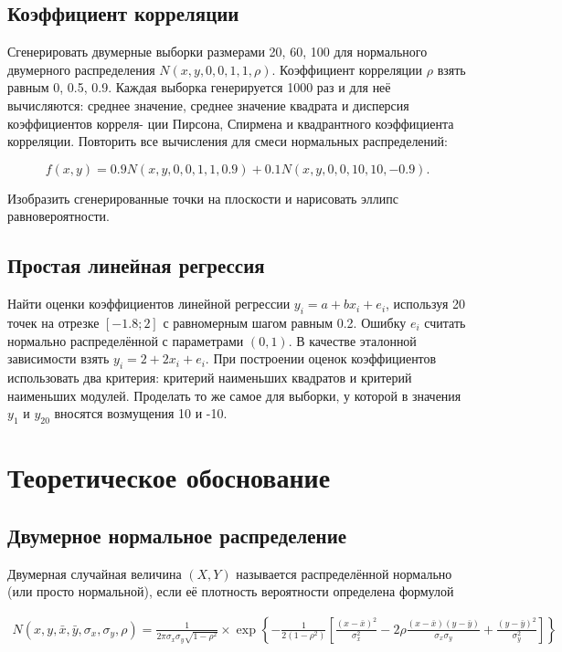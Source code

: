 \documentclass[12pt,a4paper]{article}
\begin{document}
	\subsection{Коэффициент корреляции}

	Сгенерировать двумерные выборки размерами 20, 60, 100 для нормального
	двумерного распределения \(N(x, y, 0, 0, 1, 1, \rho) \). Коэффициент
	корреляции \( \rho \) взять равным 0, 0.5, 0.9. Каждая выборка
	генерируется 1000 раз и для неё вычисляются: среднее значение, среднее
	значение квадрата и дисперсия коэффициентов корреля- ции Пирсона,
	Спирмена и квадрантного коэффициента корреляции. Повторить все
	вычисления для смеси нормальных распределений:

	\[
		f(x, y) = 0.9N(x, y, 0, 0, 1, 1, 0.9) + 0.1N(x, y, 0, 0, 10, 10, -0.9).
	\]

	Изобразить сгенерированные точки на плоскости и нарисовать эллипс
	равновероятности.

	\subsection{Простая линейная регрессия}

	Найти оценки коэффициентов линейной регрессии \( y_i = a + bx_i + e_i \),
	используя 20 точек на отрезке \( [-1.8; 2] \) с равномерным шагом равным
	0.2. Ошибку \( e_i \) считать нормально распределённой с параметрами
	\( (0, 1) \). В качестве эталонной зависимости взять
	\( y_i = 2 + 2x_i + e_i \). При построении оценок коэффициентов
	использовать два критерия: критерий наименьших квадратов и критерий
	наименьших модулей. Проделать то же самое для выборки, у которой в
	значения \( y_1 \) и \( y_{20} \) вносятся возмущения 10 и -10.

	\section{Теоретическое обоснование}

	\subsection{Двумерное нормальное распределение}

	Двумерная случайная величина \( (X, Y) \) называется распределённой
	нормально (или просто нормальной), если её плотность вероятности
	определена формулой

	\begin{align} \label{eq:multivariate_normal}
		N(x, y, \bar x, \bar y, \sigma_x, \sigma_y, \rho) = \frac{1}{2 \pi \sigma_x
		\sigma_y \sqrt{1 - \rho^2}} \times \exp \left \{ -\frac{1}{2(1 - \rho^2)}
		\left [ \frac{(x - \bar x)^2}{\sigma_x^2} - 2 \rho \frac{(x - \bar x)
		(y - \bar y)}{\sigma_x \sigma_y} + \frac{(y - \bar y)^2}{\sigma_y^2}
		\right ] \right \}
	\end{align}
\end{document}

